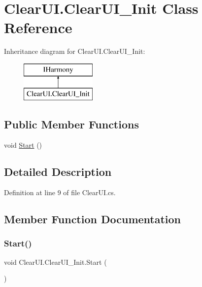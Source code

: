 \hypertarget{class_clear_u_i_1_1_clear_u_i___init}{}\section{Clear\+U\+I.\+Clear\+U\+I\+\_\+\+Init Class Reference}
\label{class_clear_u_i_1_1_clear_u_i___init}
Inheritance diagram for Clear\+U\+I.\+Clear\+U\+I\+\_\+\+Init\+:\begin{figure}[H]
\begin{center}
\leavevmode
\includegraphics[height=2.000000cm]{d5/dec/class_clear_u_i_1_1_clear_u_i___init}
\end{center}
\end{figure}
\subsection*{Public Member Functions}
\begin{DoxyCompactItemize}
\item 
void \mbox{\hyperlink{class_clear_u_i_1_1_clear_u_i___init_a35f6f2977d035f33ab9f0e63e02dae9d}{Start}} ()
\end{DoxyCompactItemize}


\subsection{Detailed Description}


Definition at line 9 of file Clear\+U\+I.\+cs.



\subsection{Member Function Documentation}
\mbox{\label{class_clear_u_i_1_1_clear_u_i___init_a35f6f2977d035f33ab9f0e63e02dae9d}} 
\subsubsection{\texorpdfstring{Start()}{Start()}}
{\footnotesize\ttfamily void Clear\+U\+I.\+Clear\+U\+I\+\_\+\+Init.\+Start (\begin{DoxyParamCaption}{ }\end{DoxyParamCaption})}




